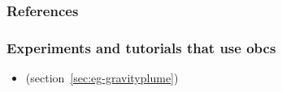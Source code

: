 
\subsubsection{References}

\subsubsection{Experiments and tutorials that use obcs}
\label{sec:pkg:obcs:experiments}

\begin{itemize}
\item {} (section~\ref{sec:eg-gravityplume})
\end{itemize}


